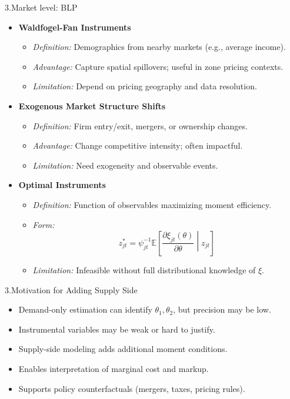 \documentclass[aspectratio=169]{beamer}  %
\begin{document}
\begin{frame}{3.Market level: BLP}
\begin{itemize}
    \item \textbf{Waldfogel-Fan Instruments}
    \begin{itemize}
        \item \textit{Definition:} Demographics from nearby markets (e.g., average income).
        \item \textit{Advantage:} Capture spatial spillovers; useful in zone pricing contexts.
        \item \textit{Limitation:} Depend on pricing geography and data resolution.
    \end{itemize}

    \item \textbf{Exogenous Market Structure Shifts}
    \begin{itemize}
        \item \textit{Definition:} Firm entry/exit, mergers, or ownership changes.
        \item \textit{Advantage:} Change competitive intensity; often impactful.
        \item \textit{Limitation:} Need exogeneity and observable events.
    \end{itemize}

    \item \textbf{Optimal Instruments}
    \begin{itemize}
        \item \textit{Definition:} Function of observables maximizing moment efficiency.
        \item \textit{Form:} \[ z^*_{jt} = \psi^{-1}_{jt} \mathbb{E} \left[ \frac{\partial \xi_{jt}(\theta)}{\partial \theta} \middle| z_{jt} \right] \]
        \item \textit{Limitation:} Infeasible without full distributional knowledge of $\xi$.
    \end{itemize}
\end{itemize}
\end{frame}

\begin{frame}{3.Motivation for Adding Supply Side}
\begin{itemize}
    \item Demand-only estimation can identify \( \theta_1, \theta_2 \), but precision may be low.
    \item Instrumental variables may be weak or hard to justify.
    \item Supply-side modeling adds additional moment conditions.
    \item Enables interpretation of marginal cost and markup.
    \item Supports policy counterfactuals (mergers, taxes, pricing rules).
\end{itemize}
\end{frame}
\end{document}
